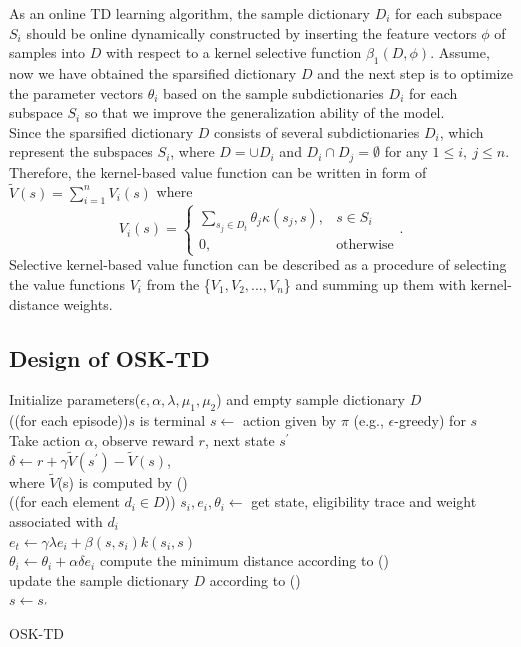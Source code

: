 \documentclass[conference]{IEEEtran}
\makeatletter
\newcommand{\removelatexerror}{\let\@latex@error\@gobble}
\newcommand{\dosemic}{\renewcommand{\@endalgocfline}{\algocf@endline}}%
\let\oldnl\nl%
\newcommand{\nonl}{\renewcommand{\nl}{\let\nl\oldnl}}%
\makeatother
\begin{document}
As an online TD learning algorithm, the sample dictionary $D_i$ for each subspace $S_i$ should be online dynamically constructed by inserting the feature vectors $\phi$ of samples into $D$ with respect to a kernel selective function $\beta_1(D, \phi)$. Assume, now we have obtained the sparsified dictionary $D$ and the next step is to optimize the parameter vectors $\theta_i$ based on the sample subdictionaries $D_i$ for each subspace $S_i$ so that we improve the generalization ability of the model.\\

Since the sparsified dictionary $D$ consists of several subdictionaries $D_i$, which represent the subspaces $S_i$, where $D=\cup D_i$ and $D_i \cap D_j = \emptyset$ for any $1 \leq i,\ j \leq n$. Therefore, the kernel-based value function can be written in form of $\widetilde{V}(s)=\sum_{i=1}^nV_i(s)$ where
\begin{equation}
	V_i(s) =	\begin{cases}
				\sum_{s_j\in D_t}\theta_j\kappa(s_j, s),& s\in S_i\\
           		0, & \text{otherwise}
      		\end{cases}.
\end{equation}
Selective kernel-based value function can be described as a procedure of selecting  the value functions $V_i$ from the \{$V_1, V_2,..., V_n$\} and summing up them with kernel-distance weights.
\subsection{Design of OSK-TD}
{
	\removelatexerror%
	\LinesNumbered
	\begin{algorithm}[H]
		\textup{Initialize parameters($\epsilon, \alpha,\lambda, \mu_1, \mu_2$) and empty sample dictionary $D$}\\

		\Repeat({(for each episode)}){$s$ is terminal}{
	  		$s\leftarrow$ action given by $\pi$ (e.g., $\epsilon$-greedy) for $s$\\
	  		Take action $\alpha$, observe reward $r$, next state $s^{'}$\\
	  		$\delta \leftarrow r+\gamma\widetilde{V}(s^{'})-\widetilde{V}(s)$,\\
	  		\dosemic\nonl where $\widetilde{V}$(s) is computed by ()\\
  		
  			\Repeat({(for each element $d_i\in D$)}){}{
	  			$s_i, e_i, \theta_i \leftarrow$ get state, eligibility trace and weight associated with $d_i$\\
	  			$e_t\leftarrow \gamma\lambda e_i+\beta(s, s_i)k(s_i, s)$\\
	  			$\theta_i \leftarrow \theta_i + \alpha\delta e_i$
  			}
  			compute the minimum distance according to ()\\
  			update the sample dictionary $D$ according to ()\\
  			$s\leftarrow s_{'}$
  		}
 		\caption{OSK-TD}
	\end{algorithm}
}
\end{document}
